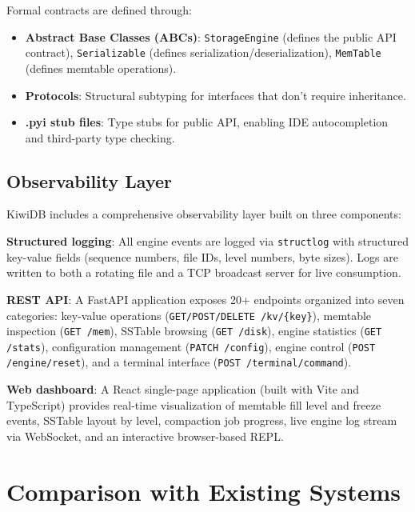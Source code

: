 \documentclass[conference]{IEEEtran}
\begin{document}
Formal contracts are defined through:
\begin{itemize}[leftmargin=*]
    \item \textbf{Abstract Base Classes (ABCs)}: \texttt{StorageEngine} (defines the public API contract), \texttt{Serializable} (defines serialization/deserialization), \texttt{MemTable} (defines memtable operations).
    \item \textbf{Protocols}: Structural subtyping for interfaces that don't require inheritance.
    \item \textbf{.pyi stub files}: Type stubs for public API, enabling IDE autocompletion and third-party type checking.
\end{itemize}

\subsection{Observability Layer}

KiwiDB includes a comprehensive observability layer built on three components:

\textbf{Structured logging}: All engine events are logged via \texttt{structlog} with structured key-value fields (sequence numbers, file IDs, level numbers, byte sizes). Logs are written to both a rotating file and a TCP broadcast server for live consumption.

\textbf{REST API}: A FastAPI application exposes 20+ endpoints organized into seven categories: key-value operations (\texttt{GET/POST/DELETE /kv/\{key\}}), memtable inspection (\texttt{GET /mem}), SSTable browsing (\texttt{GET /disk}), engine statistics (\texttt{GET /stats}), configuration management (\texttt{PATCH /config}), engine control (\texttt{POST /engine/reset}), and a terminal interface (\texttt{POST /terminal/command}).

\textbf{Web dashboard}: A React single-page application (built with Vite and TypeScript) provides real-time visualization of memtable fill level and freeze events, SSTable layout by level, compaction job progress, live engine log stream via WebSocket, and an interactive browser-based REPL.

\section{Comparison with Existing Systems}
\label{sec:comparison}
\end{document}
